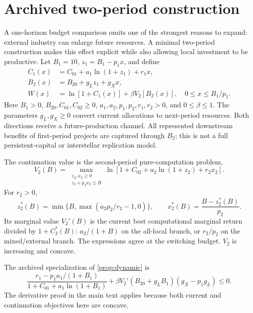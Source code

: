 \section{Archived two-period construction}
\label{supp:dynamic}

A one-horizon budget comparison omits one of the strongest reasons to expand: external industry can enlarge future resources. A minimal two-period construction makes this effect explicit while also allowing local investment to be productive. Let $B_1=10$, $z_1=B_1-p_1x$, and define
\begin{align}
 C_1(x)&=C_{01}+a_1\ln(1+z_1)+r_1x,\nonumber\\
 B_2(x)&=B_{20}+g_Lz_1+g_Xx,\label{eq:futurebudget}\\
 W(x)&=\ln[1+C_1(x)]+\beta V_2[B_2(x)],\quad 0\leq x\leq B_1/p_1.
 \label{eq:dynamic}
\end{align}
Here $B_1>0$, $B_{20},C_{01},C_{02}\geq0$, $a_1,a_2,p_1,p_2,r_1,r_2>0$, and $0\leq\beta\leq1$. The parameters $g_L,g_X\geq0$ convert current allocations to next-period resources. Both directions receive a future-production channel. All represented downstream benefits of first-period projects are captured through $B_2$; this is not a full persistent-capital or interstellar replication model.

The continuation value is the second-period pure-computation problem,
\begin{equation}
 V_2(B)=\max_{\substack{z_2,x_2\geq0\\z_2+p_2x_2\leq B}}\ln[1+C_{02}+a_2\ln(1+z_2)+r_2x_2].
 \label{eq:continuation}
\end{equation}
For $r_2>0$,
\begin{equation}
 z_2^*(B)=\min\{B,\max(a_2p_2/r_2-1,0)\},\qquad
 x_2^*(B)=\frac{B-z_2^*(B)}{p_2}.
 \label{eq:stage2}
\end{equation}
Its marginal value $V_2'(B)$ is the current best computational marginal return divided by $1+C_2^*(B)$: $a_2/(1+B)$ on the all-local branch, or $r_2/p_2$ on the mixed/external branch. The expressions agree at the switching budget. $V_2$ is increasing and concave.

The archived specialization of \cref{prop:dynamic} is
\begin{equation}
 \frac{r_1-p_1a_1/(1+B_1)}{1+C_{01}+a_1\ln(1+B_1)}
 +\beta V_2'(B_{20}+g_LB_1)(g_X-p_1g_L)\leq0.
 \label{eq:dynamiccriterion}
\end{equation}
The derivative proof in the main text applies because both current and
continuation objectives here are concave.


